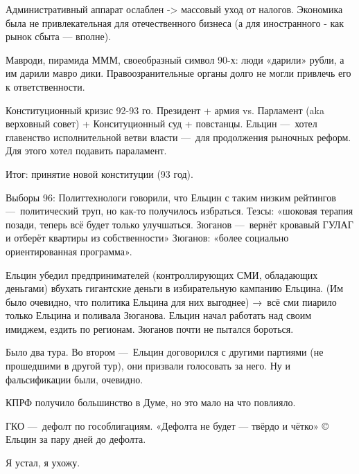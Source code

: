 \documentclass[12pt, a4paper]{article}
\begin{document}
Административный аппарат ослаблен -> массовый уход от налогов.
Экономика была не привлекательная для отечественного бизнеса (а для иностранного - как рынок сбыта — вполне).

Мавроди, пирамида МММ, своеобразный символ 90-х: люди «дарили» рубли, а им дарили мавро дики.
Правоозранительные органы долго не могли привлечь его к ответственности.

Конституционный кризис 92-93 го. Президент + армия vs. Парламент (aka верховный совет) + Конситуционный суд + повстанцы.
Ельцин — хотел главенство исполнительной ветви власти — для продолжения рыночных реформ.
Для этого хотел подавить параламент.

Итог: принятие новой конституции (93 год).

Выборы 96: Политтехнологи говорили, что Ельцин с таким низким рейтингов — политический труп, 
но как-то получилось избраться.
Тезсы: «шоковая терапия позади, теперь всё будет только улучшаться. Зюганов — вернёт кровавый ГУЛАГ и отберёт квартиры из собственности»
Зюганов: «более социально ориентированная программа».

Ельцин убедил предпринимателей (контроллирующих СМИ, обладающих деньгами) вбухать гигантские деньги в избирательную кампанию Ельцина.
(Им было очевидно, что политика Ельцина для них выгоднее) → всё сми пиарило только Ельцина и поливала Зюганова. 
Ельцин начал работать над своим имиджем, ездить по регионам.
Зюганов почти не пытался бороться.

Было два тура. Во втором — Ельцин договорился с другими партиями (не прошедшими в другой тур), они призвали голосовать за него.
Ну и фальсификации были, очевидно.

КПРФ получило большинство в Думе, но это мало на что повлияло.

ГКО — дефолт по гособлигациям.
«Дефолта не будет — твёрдо и чётко» © Ельцин за пару дней до дефолта.

Я устал, я ухожу.
\end{document}
